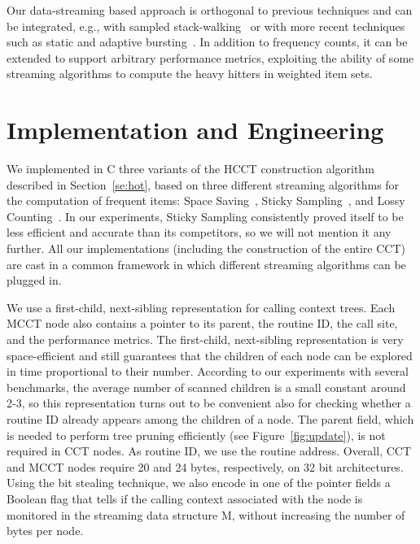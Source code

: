 \documentclass{sigplanconf}
\begin{document}
Our data-streaming based approach is orthogonal to previous techniques and can be integrated, e.g., with sampled stack-walking~\cite{AS00, W00} or with more recent techniques such as static and adaptive bursting~\cite{ZSCC06}. In addition to frequency counts, it can be extended to support arbitrary performance metrics, exploiting the ability of some streaming algorithms to compute the heavy hitters in weighted item sets. 


\section{Implementation and Engineering}
\label{se:implementation}

We implemented in C three variants of the HCCT construction algorithm described in Section~\ref{se:hot}, based on three different streaming algorithms for the computation of frequent items: Space Saving~\cite{MAA06}, Sticky Sampling~\cite{MM02}, and Lossy Counting~\cite{MM02}. In our experiments, Sticky Sampling consistently proved itself to be less efficient and accurate than its competitors, so we will not mention it any further. All our implementations (including the construction of the entire CCT) are cast in a common framework in which different streaming algorithms can be plugged in.

We use a first-child, next-sibling representation for calling context trees. Each MCCT node also contains a pointer to its parent, the routine ID, the call site, and the performance metrics. The first-child, next-sibling representation is very space-efficient and still guarantees that the children of each node can be explored in time proportional to their number. According to our experiments with several benchmarks, the average number of scanned children is a small constant around 2-3, so this representation turns out to be convenient also for checking whether a routine ID already appears among the children of a node. The parent field, which is needed to perform tree pruning efficiently (see Figure~\ref{fig:update}), is not required in CCT nodes. As routine ID, we use the routine address. Overall, CCT and MCCT nodes require 20 and 24 bytes, respectively, on 32 bit architectures. Using the bit stealing technique, we also encode in one of the pointer fields a Boolean flag that tells if the calling context associated with the node is monitored in the streaming data structure M, without increasing the number of bytes per node. 
\end{document}
